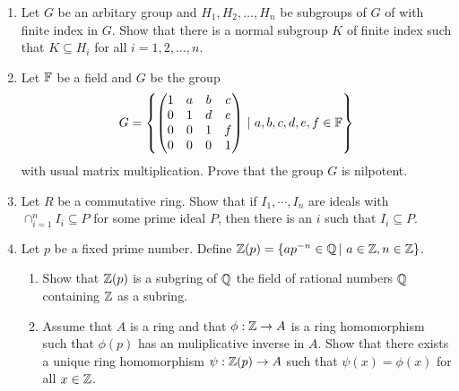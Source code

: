\begin{enumerate}
 \item Let $G$ be an arbitary group and $H_1, H_2, \dots, H_n$ be subgroups
 of $G$ of with finite index in $G$. Show that there is a normal subgroup
 $K$ of finite index such that $ K \subseteq H_i $ for all $ i=1, 2, \dots, n$.

\vspace{0.2in}


\item  Let ${\Bbb F}$ be a field and $G$ be the group 
\[ G=\left\lbrace \begin{pmatrix} 1&a&b&c\\0&1&d&e\\0&0&1&f\\0&0&0&1\end{pmatrix}\,|\  a,
 b, c, d, e, f \in {\Bbb F} \right\rbrace \]
with usual matrix multiplication. Prove that the group $G$ is nilpotent.

\vspace{0.2in}
 

\item Let $ R$ be a commutative ring. Show that if $I_1, \cdots, I_n $ are
ideals with $ \cap _{i=1}^n I_i \subseteq P$ for some prime ideal $P$, then
there is an $i $ such that $ I_i \subseteq P$.

\vspace{0.2in}
 
\item Let $p$ be a fixed prime number. Define 
${\Bbb Z}(p)=\{ ap^{-n} \in {\Bbb Q}\, |\ a \in {\Bbb Z}, n \in {\Bbb Z}\}$. 

\vspace{0.2in}

\begin{enumerate}
\item Show that $ {\Bbb Z}(p) $ is a
subgring of $ {\Bbb Q} $ the field of rational numbers ${\Bbb Q}$ containing ${\Bbb Z}$ as
a subring.\\
\item Assume that $A$ is a ring and that $ \phi: {\Bbb Z} \rightarrow A $
is a ring homomorphism such that $\phi(p) $ has an muliplicative inverse in $A$. 
Show that there
exists a unique ring homomorphism $ \psi: {\Bbb Z}(p)\rightarrow A$ such that 
$\psi(x)=\phi(x) $ for all $ x \in {\Bbb Z}$.
\end{enumerate}


\end{enumerate}
